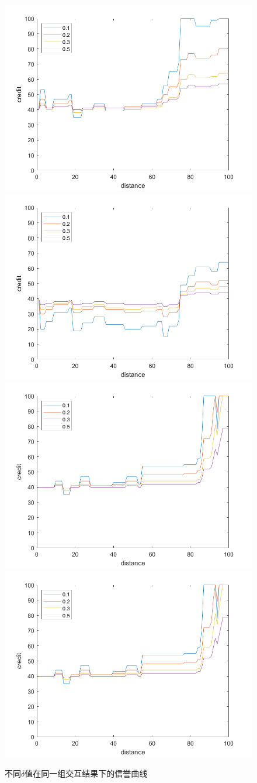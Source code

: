 \begin{figure}
  \centering
    {\includegraphics[width=0.49\linewidth]{figures/decay_even_80.png}}
    {\includegraphics[width=0.49\linewidth]{figures/decay_even_60.png}}
    {\includegraphics[width=0.49\linewidth]{figures/decay_ueven_80.png}}
    {\includegraphics[width=0.49\linewidth]{figures/decay_ueven_80.png}}
  \caption{不同$\delta$值在同一组交互结果下的信誉曲线}
  \label{fig:decay_comp}
\end{figure}

